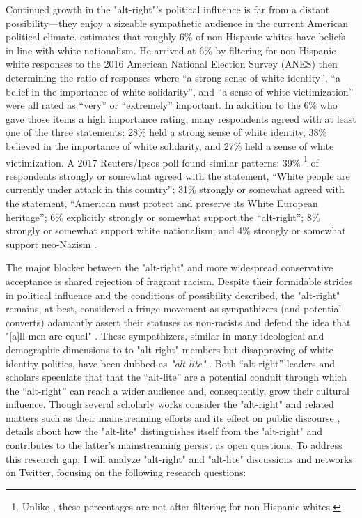 \documentclass[acmlarge, screen, authorversion]{acmart}
\begin{document}
Continued growth in the "alt-right"'s political influence is far from a distant possibility---they enjoy a sizeable sympathetic audience in the current American political climate. \citet{hawleyDemographyAltRight2018} estimates that roughly 6\% of non-Hispanic whites have beliefs in line with white nationalism. He arrived at 6\% by filtering for non-Hispanic white responses to the 2016 American National Election Survey (ANES) then determining the ratio of responses where “a strong sense of white identity”, “a belief in the importance of white solidarity”, and “a sense of white victimization” were all rated as “very” or “extremely” important. In addition to the 6\% who gave those items a high importance rating, many respondents agreed with at least one of the three statements: 28\% held a strong sense of white identity, 38\% believed in the importance of white solidarity, and 27\% held a sense of white victimization. A 2017 Reuters/Ipsos poll found similar patterns: 39\% \footnote{Unlike \citet{hawleyDemographyAltRight2018}, these percentages are not after filtering for non-Hispanic whites.} of respondents strongly or somewhat agreed with the statement, “White people are currently under attack in this country”; 31\% strongly or somewhat agreed with the statement, “American must protect and preserve its White European heritage”; 6\% explicitly strongly or somewhat support the “alt-right”; 8\% strongly or somewhat support white nationalism; and 4\% strongly or somewhat support neo-Nazism \cite{politicsNewPollAmericans}.

The major blocker between the "alt-right" and more widespread conservative acceptance is shared
rejection of fragrant racism. Despite their formidable strides in political influence and the
conditions of possibility described, the "alt-right" remains, at best, considered a fringe movement
as sympathizers (and potential converts) adamantly assert their statuses as non-racists and defend
the idea that "[a]ll men are equal" \cite{mainRiseAltRight2018, hawleyAltRightWhatEveryone2018}.
These sympathizers, similar in many ideological and demographic dimensions to to "alt-right" members
but disapproving of white-identity politics, have been dubbed as \textit{"alt-lite"}
\cite{mainRiseAltRight2018, hawleyAltRightWhatEveryone2018}. Both ``alt-right'' leaders and scholars
speculate that that the ``alt-lite'' are a potential conduit through which the “alt-right” can reach a wider audience and, consequently, grow their cultural influence. Though several scholarly works
consider the "alt-right" \cite{mainRiseAltRight2018, hawleyMakingSenseAltright2017, nagleKillAllNormies2017}
and related matters such as their mainstreaming
efforts \cite{gallaherMainstreamingWhiteSupremacy2020} and its effect on public discourse
\cite{sternProudBoysWhite2019, cammaertsMainstreamingExtremeRightWing2018}, details about how the
"alt-lite" distinguishes itself from the "alt-right" and contributes to the latter's mainstreaming
persist as open questions. To address this research gap, I will analyze "alt-right" and "alt-lite"
discussions and networks on Twitter, focusing on the following research questions:
\end{document}
